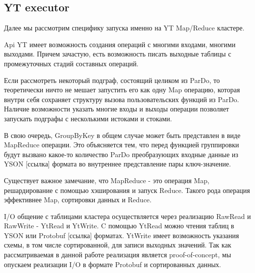 \subsection{YT executor}

Далее мы рассмотрим специфику запуска именно на YT Map/Reduce кластере.

Api YT имеет возможность создания операций с многими входами, многими выходами. Причем зачастую, есть возможность писать выходные таблицы с промежуточных стадий составных операций.

Если рассмотреть некоторый подграф, состоящий целиком из ParDo, то теоретически ничто не мешает запустить его как одну Map операцию, которая внутри себя сохраняет структуру вызова пользовательских функций из ParDo. Наличие возможности указать многие входы и выходы операции позволяет запускать подграфы с несколькими истоками и стоками.

В свою очередь, GroupByKey в общем случае может быть представлен в виде MapReduce операции. Это объясняется тем, что перед функцией группировки будут вызвано какое-то количество ParDo преобразующих входные данные из YSON [ссылка] формата во внутреннее представление пары ключ-значение.

Существует важное замечание, что MapReduce - это операция Map, решардирование с помощью хэширования и запуск Reduce. Такого рода операция эффективнее Map, сортировки данных и Reduce.

I/O общение с таблицами кластера осуществляется через реализацию RawRead и RawWrite - YtRead и YtWrite. C помощью YtRead можно чтения таблиц в YSON или Protobuf [ссылка] форматах. YtWrite имеет возможность указания схемы, в том числе сортированной, для записи выходных значений. Так как рассматриваемая в данной работе реализация является proof-of-concept, мы опускаем реализации I/O в формате Protobuf и сортированных данных.
